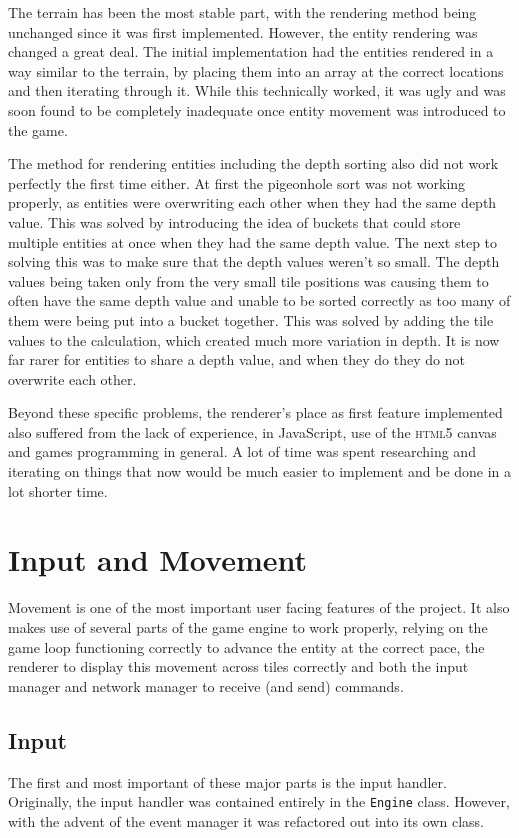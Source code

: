 The terrain has been the most stable part, with the rendering method being unchanged since it was first implemented. However, the entity rendering was changed a great deal. The initial implementation had the entities rendered in a way similar to the terrain, by placing them into an array at the correct locations and then iterating through it. While this technically worked, it was ugly and was soon found to be completely inadequate once entity movement was introduced to the game.

The method for rendering entities including the depth sorting also did not work perfectly the first time either. At first the pigeonhole sort was not working properly, as entities were overwriting each other when they had the same depth value. This was solved by introducing the idea of buckets that could store multiple entities at once when they had the same depth value. The next step to solving this was to make sure that the depth values weren't so small. The depth values being taken only from the very small tile positions was causing them to often have the same depth value and unable to be sorted correctly as too many of them were being put into a bucket together. This was solved by adding the tile values to the calculation, which created much more variation in depth. It is now far rarer for entities to share a depth value, and when they do they do not overwrite each other.

Beyond these specific problems, the renderer's place as first feature implemented also suffered from the lack of experience, in JavaScript, use of the \textsc{html5} canvas and games programming in general. A lot of time was spent researching and iterating on things that now would be much easier to implement and be done in a lot shorter time.

\section{Input and Movement}
Movement is one of the most important user facing features of the project. It also makes use of several parts of the game engine to work properly, relying on the game loop functioning correctly to advance the entity at the correct pace, the renderer to display this movement across tiles correctly and both the input manager and network manager to receive (and send) commands.

\subsection{Input}
The first and most important of these major parts is the input handler. Originally, the input handler was contained entirely in the \texttt{Engine} class. However, with the advent of the event manager it was refactored out into its own class.

